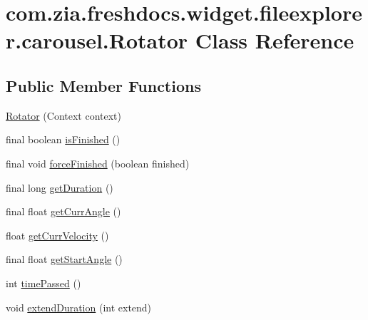 \hypertarget{classcom_1_1zia_1_1freshdocs_1_1widget_1_1fileexplorer_1_1carousel_1_1_rotator}{\section{com.\-zia.\-freshdocs.\-widget.\-fileexplorer.\-carousel.\-Rotator Class Reference}
\label{classcom_1_1zia_1_1freshdocs_1_1widget_1_1fileexplorer_1_1carousel_1_1_rotator}
}
\subsection*{Public Member Functions}
\begin{DoxyCompactItemize}
\item 
\hyperlink{classcom_1_1zia_1_1freshdocs_1_1widget_1_1fileexplorer_1_1carousel_1_1_rotator_aa10d69d959b645a642bf69adc5a073d4}{Rotator} (Context context)
\item 
final boolean \hyperlink{classcom_1_1zia_1_1freshdocs_1_1widget_1_1fileexplorer_1_1carousel_1_1_rotator_a915636b61fc5f89010cfed82ba351324}{is\-Finished} ()
\item 
final void \hyperlink{classcom_1_1zia_1_1freshdocs_1_1widget_1_1fileexplorer_1_1carousel_1_1_rotator_a5690382de5045d670c59f40fd9213bd9}{force\-Finished} (boolean finished)
\item 
final long \hyperlink{classcom_1_1zia_1_1freshdocs_1_1widget_1_1fileexplorer_1_1carousel_1_1_rotator_a8207e93f51c5890e4e053aad9dcd8d1f}{get\-Duration} ()
\item 
final float \hyperlink{classcom_1_1zia_1_1freshdocs_1_1widget_1_1fileexplorer_1_1carousel_1_1_rotator_ae942ac64d4ad61bfe34d0169afda96cb}{get\-Curr\-Angle} ()
\item 
float \hyperlink{classcom_1_1zia_1_1freshdocs_1_1widget_1_1fileexplorer_1_1carousel_1_1_rotator_ab43104fdbe5dee316480b9e763d6d989}{get\-Curr\-Velocity} ()
\item 
final float \hyperlink{classcom_1_1zia_1_1freshdocs_1_1widget_1_1fileexplorer_1_1carousel_1_1_rotator_a2b0cca08445fb9ec231dd2c9e8d97e24}{get\-Start\-Angle} ()
\item 
int \hyperlink{classcom_1_1zia_1_1freshdocs_1_1widget_1_1fileexplorer_1_1carousel_1_1_rotator_ad09c4809f9d6bfc74f9d52ffbda74381}{time\-Passed} ()
\item 
void \hyperlink{classcom_1_1zia_1_1freshdocs_1_1widget_1_1fileexplorer_1_1carousel_1_1_rotator_a3b851c39f6020cdb9d306337aaa59561}{extend\-Duration} (int extend)

\end{DoxyCompactItemize}
